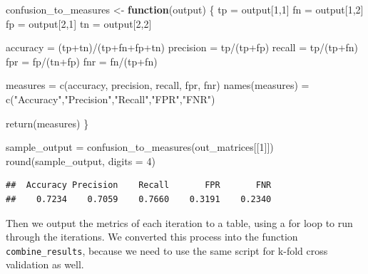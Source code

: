 \documentclass[
]{article}
\newenvironment{Shaded}{\begin{snugshade}}{\end{snugshade}}
\newcommand{\AttributeTok}[1]{\textcolor[rgb]{0.77,0.63,0.00}{#1}}
\newcommand{\ControlFlowTok}[1]{\textcolor[rgb]{0.13,0.29,0.53}{\textbf{#1}}}
\newcommand{\DecValTok}[1]{\textcolor[rgb]{0.00,0.00,0.81}{#1}}
\newcommand{\FunctionTok}[1]{\textcolor[rgb]{0.00,0.00,0.00}{#1}}
\newcommand{\NormalTok}[1]{#1}
\newcommand{\OtherTok}[1]{\textcolor[rgb]{0.56,0.35,0.01}{#1}}
\newcommand{\SpecialCharTok}[1]{\textcolor[rgb]{0.00,0.00,0.00}{#1}}
\newcommand{\StringTok}[1]{\textcolor[rgb]{0.31,0.60,0.02}{#1}}
\begin{document}
\begin{Shaded}
\begin{Highlighting}[]
\NormalTok{confusion\_to\_measures }\OtherTok{\textless{}{-}} \ControlFlowTok{function}\NormalTok{(output) \{}
\NormalTok{  tp }\OtherTok{=}\NormalTok{ output[}\DecValTok{1}\NormalTok{,}\DecValTok{1}\NormalTok{]}
\NormalTok{  fn }\OtherTok{=}\NormalTok{ output[}\DecValTok{1}\NormalTok{,}\DecValTok{2}\NormalTok{]}
\NormalTok{  fp }\OtherTok{=}\NormalTok{ output[}\DecValTok{2}\NormalTok{,}\DecValTok{1}\NormalTok{]}
\NormalTok{  tn }\OtherTok{=}\NormalTok{ output[}\DecValTok{2}\NormalTok{,}\DecValTok{2}\NormalTok{]}
  
\NormalTok{  accuracy }\OtherTok{=}\NormalTok{ (tp}\SpecialCharTok{+}\NormalTok{tn)}\SpecialCharTok{/}\NormalTok{(tp}\SpecialCharTok{+}\NormalTok{fn}\SpecialCharTok{+}\NormalTok{fp}\SpecialCharTok{+}\NormalTok{tn)}
\NormalTok{  precision }\OtherTok{=}\NormalTok{ tp}\SpecialCharTok{/}\NormalTok{(tp}\SpecialCharTok{+}\NormalTok{fp)}
\NormalTok{  recall }\OtherTok{=}\NormalTok{ tp}\SpecialCharTok{/}\NormalTok{(tp}\SpecialCharTok{+}\NormalTok{fn)}
\NormalTok{  fpr }\OtherTok{=}\NormalTok{ fp}\SpecialCharTok{/}\NormalTok{(tn}\SpecialCharTok{+}\NormalTok{fp)}
\NormalTok{  fnr }\OtherTok{=}\NormalTok{ fn}\SpecialCharTok{/}\NormalTok{(tp}\SpecialCharTok{+}\NormalTok{fn)}
  
\NormalTok{  measures }\OtherTok{=} \FunctionTok{c}\NormalTok{(accuracy, precision, recall, fpr, fnr)}
  \FunctionTok{names}\NormalTok{(measures) }\OtherTok{=} \FunctionTok{c}\NormalTok{(}\StringTok{"Accuracy"}\NormalTok{,}\StringTok{"Precision"}\NormalTok{,}\StringTok{"Recall"}\NormalTok{,}\StringTok{"FPR"}\NormalTok{,}\StringTok{"FNR"}\NormalTok{)}
  
  \FunctionTok{return}\NormalTok{(measures)}
\NormalTok{\}}

\NormalTok{sample\_output }\OtherTok{=} \FunctionTok{confusion\_to\_measures}\NormalTok{(out\_matrices[[}\DecValTok{1}\NormalTok{]])}
\FunctionTok{round}\NormalTok{(sample\_output, }\AttributeTok{digits =} \DecValTok{4}\NormalTok{)}
\end{Highlighting}
\end{Shaded}

\begin{verbatim}
##  Accuracy Precision    Recall       FPR       FNR 
##    0.7234    0.7059    0.7660    0.3191    0.2340
\end{verbatim}

Then we output the metrics of each iteration to a table, using a for
loop to run through the iterations. We converted this process into the
function \texttt{combine\_results}, because we need to use the same
script for k-fold cross validation as well.
\end{document}
